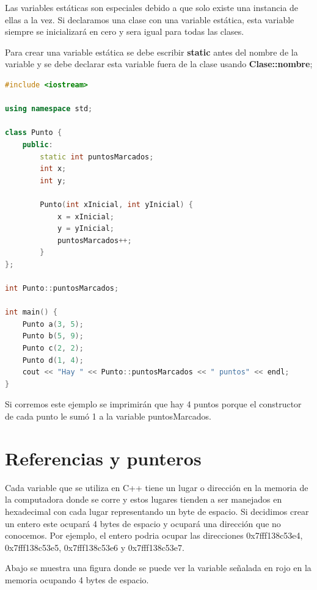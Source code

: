 \documentclass{article}
\begin{document}
Las variables estáticas son especiales debido a que solo existe una instancia de ellas a la vez. Si declaramos una clase con una variable estática, esta variable siempre se inicializará en cero y sera igual para todas las clases.

Para crear una variable estática se debe escribir \textbf{static} antes del nombre de la variable y se debe declarar esta variable fuera de la clase usando \textbf{Clase::nombre};

\begin{lstlisting}[language=C++, caption=Variables estáticas]
#include <iostream>

using namespace std;

class Punto {	
    public:
        static int puntosMarcados;
        int x;
        int y;

        Punto(int xInicial, int yInicial) {
            x = xInicial;
            y = yInicial;
            puntosMarcados++;
        }
};

int Punto::puntosMarcados;

int main() {
    Punto a(3, 5);
    Punto b(5, 9);
    Punto c(2, 2);
    Punto d(1, 4);
    cout << "Hay " << Punto::puntosMarcados << " puntos" << endl;
}    
\end{lstlisting}

Si corremos este ejemplo se imprimirán que hay 4 puntos porque el constructor de cada punto le sumó 1 a la variable puntosMarcados.

\section{Referencias y punteros}

Cada variable que se utiliza en C++ tiene un lugar o dirección en la memoria de la computadora donde se corre y estos lugares tienden a ser manejados en hexadecimal con cada lugar representando un byte de espacio. Si decidimos crear un entero este ocupará 4 bytes de espacio y ocupará una dirección que no conocemos. Por ejemplo, el entero podria ocupar las direcciones 0x7fff138c53e4, 0x7fff138c53e5, 0x7fff138c53e6 y 0x7fff138c53e7.

Abajo se muestra una figura donde se puede ver la variable señalada en rojo en la memoria ocupando 4 bytes de espacio.
\end{document}
